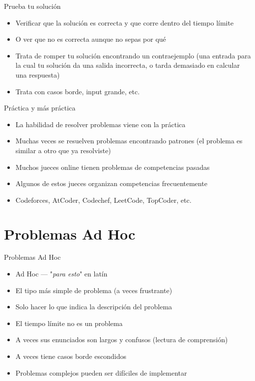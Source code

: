 \documentclass[10pt]{beamer}
\newcommand{\bi}{\begin{itemize}}
\newcommand{\ei}{\end{itemize}}
\begin{document}
\begin{frame}{Prueba tu solución}
    \bi
        \item Verificar que la solución es correcta y que corre dentro del tiempo límite 
        \item O ver que no es correcta aunque no sepas por qué
        \vspace{10pt}
        \item Trata de romper tu solución encontrando un contraejemplo (una entrada para la cual tu solución da una salida incorrecta, o tarda demasiado en calcular una respuesta)
        \item Trata con casos borde, input grande, etc.
    \ei
\end{frame}

\begin{frame}{Práctica y más práctica}
    \bi
        \item La habilidad de resolver problemas viene con la práctica
        \item Muchas veces se resuelven problemas encontrando patrones (el problema es similar a otro que ya resolviste)
        \item Muchos jueces online tienen problemas de competencias pasadas
        \item Algunos de estos jueces organizan competencias frecuentemente
        \item Codeforces, AtCoder, Codechef, LeetCode, TopCoder, etc.
    \ei
\end{frame}


\section{Problemas Ad Hoc}

\begin{frame}{Problemas Ad Hoc}
    \bi
        \item Ad Hoc --- "\textit{para esto}" en latín
        \item El tipo más simple de problema (a veces frustrante)
        \item Solo hacer lo que indica la descripción del problema
        \item El tiempo límite no es un problema
        \item A veces sus enunciados son largos y confusos (lectura de comprensión)
        \item A veces tiene casos borde escondidos
        \item Problemas complejos pueden ser difíciles de implementar
    \ei
\end{frame}
\end{document}
